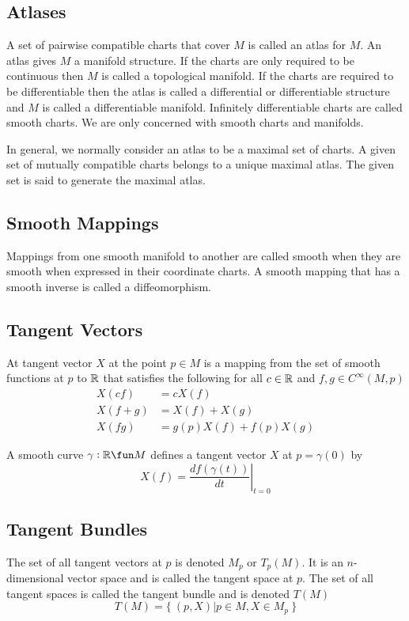 \documentclass[11pt, oneside]{article}
\begin{document}
\subsection{Atlases}
A set of pairwise compatible charts that cover $M$ is called an atlas for $M$.
An atlas gives $M$ a manifold structure.
If the charts are only required to be continuous then $M$ is called a topological manifold.
If the charts are required to be differentiable then the atlas is called a differential or differentiable structure and $M$ is called
a differentiable manifold.
Infinitely differentiable charts are called smooth charts.
We are only concerned with smooth charts and manifolds.

In general, we normally consider an atlas to be a maximal set of charts.
A given set of mutually compatible charts belongs to a unique maximal atlas.
The given set is said to generate the maximal atlas.

\subsection{Smooth Mappings}
Mappings from one smooth manifold to another are called smooth when they are smooth when expressed in their coordinate charts.
A smooth mapping that has a smooth inverse is called a diffeomorphism.

\subsection{Tangent Vectors}
At tangent vector $X$ at the point $p \in M$ is a mapping from the set of smooth functions at $p$ to $\mathbb{R}$ that satisfies the following 
for all $c \in \mathbb{R}$ and $f,g \in C^{\infty}(M,p)$
\begin{align}
	X(cf) &= cX(f) \\
	X(f + g) &= X(f) + X(g) \\
	X(fg) &= g(p)X(f) + f(p)X(g)
\end{align}

A smooth curve $\gamma: \R \fun M$ defines a tangent vector $X$ at $p=\gamma(0)$ by
\begin{equation}
	X(f) = \left.\frac{df(\gamma(t))}{dt}\right|_{t=0}
\end{equation}

\subsection{Tangent Bundles}

The set of all tangent vectors at $p$ is denoted $M_p$ or $T_p(M)$. 
It is an $n$-dimensional vector space and is called the tangent space at $p$.
The set of all tangent spaces is called the tangent bundle and is denoted $T(M)$
\begin{equation}
	T(M) = \{~ (p,X) | p \in M, X \in M_p ~\}
\end{equation}
\end{document}
